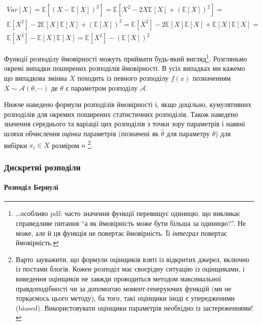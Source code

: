 \documentclass[
  11pt,
]{book}
\begin{document}
\[
\begin{aligned}
  Var[X] = \mathbb{E} \left[ (X - \mathbb{E}[X])^2 \right] = \mathbb{E} \left[ X^2 - 2X \mathbb{E} [X] + (\mathbb{E} [X])^2 \right] = \\
  \mathbb{E} [X^2] - 2 \mathbb{E}[X] \mathbb{E}[X] + (\mathbb{E}[X])^2 = \mathbb{E} [X^2] - 2 \mathbb{E}[X] \mathbb{E}[X] + \mathbb{E}[X] \mathbb{E}[X] = \\
  \mathbb{E}[X^2] - \mathbb{E}[X] \mathbb{E}[X] = \mathbb{E}[X^2] - (\mathbb{E}[X])^2
\end{aligned}
\]

Функції розподілу ймовірності можуть приймати будь-який вигляд\footnote{\ldots особливо pdf: часто значення функції перевищує одиницю, що викликає справедливе питання ``а як ймовірність може бути більша за одиницю?''. Не може, але й ця функція не повертає ймовірність. Її \emph{інтеграл} повертає ймовірність.}. Розгляньмо окремі випадки поширених розподілів ймовірності. В усіх випадках ми кажемо що випадкова змінна \(X\) походить із певного розподілу \(f(x)\) позначенням \(X \sim \mathcal{A}(\theta, \cdots)\) де \(\theta\) є параметром розподілу \(\mathcal{A}\).

Нижче наведено формули розподілів ймовірності і, якщо доцільно, кумулятивних розподілів для окремих поширених статистичних розподілів. Також наведено значення середнього та варіації цих розподілів з точки зору параметрів і наявні шляхи обчислення \emph{оцінки} параметрів (позначені як \(\hat{\theta}\) для параметру \(\theta\)) для вибірки \(x_i \in X\) розміром \(n\) \footnote{Варто зауважити, що формули оцінщиків взяті із відкритих джерел, включно із постами блогів. Кожен розподіл має своєрідну ситуацію із оцінщиками, і виведення оцінщиків не завжди проводиться методом максимальної правдоподібності чи за допомогою момент-генеруючих функцій (ми не торкаємось цього методу), ба того, такі оцінщики іноді є упередженими (biased). Використовувати оцінщики параметрів необхідно із застереженнями!}.

\subsubsection{Дискретні розподіли}\label{ux434ux438ux441ux43aux440ux435ux442ux43dux456-ux440ux43eux437ux43fux43eux434ux456ux43bux438}

\paragraph{Розподіл Бернулі}\label{ux440ux43eux437ux43fux43eux434ux456ux43b-ux431ux435ux440ux43dux443ux43bux456}
\end{document}
